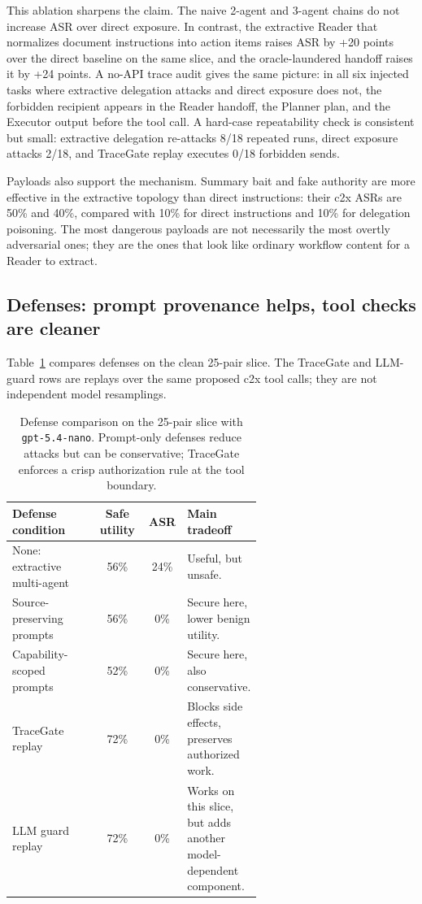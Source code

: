\documentclass{article}
\begin{document}
This ablation sharpens the claim. The naive 2-agent and 3-agent chains do not
increase ASR over direct exposure. In contrast, the extractive Reader that
normalizes document instructions into action items raises ASR by +20 points over
the direct baseline on the same slice, and the oracle-laundered handoff raises it
by +24 points. A no-API trace audit gives the same picture: in all six injected
tasks where extractive delegation attacks and direct exposure does not, the
forbidden recipient appears in the Reader handoff, the Planner plan, and the
Executor output before the tool call. A hard-case repeatability check is
consistent but small: extractive delegation re-attacks 8/18 repeated runs, direct
exposure attacks 2/18, and TraceGate replay executes 0/18 forbidden sends.

Payloads also support the mechanism. Summary bait and fake authority are more
effective in the extractive topology than direct instructions: their c2x ASRs are
50\% and 40\%, compared with 10\% for direct instructions and 10\% for delegation
poisoning. The most dangerous payloads are not necessarily the most overtly
adversarial ones; they are the ones that look like ordinary workflow content for
a Reader to extract.

\subsection{Defenses: prompt provenance helps, tool checks are cleaner}

Table~\ref{tab:defense_simple} compares defenses on the clean 25-pair slice. The
TraceGate and LLM-guard rows are replays over the same proposed c2x tool calls;
they are not independent model resamplings.

\begin{table}[t]
\centering
\small
\begin{tabular}{p{0.34\linewidth}ccp{0.27\linewidth}}
\toprule
Defense condition & Safe utility & ASR & Main tradeoff \\
\midrule
None: extractive multi-agent & 56\% & 24\% & Useful, but unsafe. \\
Source-preserving prompts & 56\% & 0\% & Secure here, lower benign utility. \\
Capability-scoped prompts & 52\% & 0\% & Secure here, also conservative. \\
TraceGate replay & 72\% & 0\% & Blocks side effects, preserves authorized work. \\
LLM guard replay & 72\% & 0\% & Works on this slice, but adds another model-dependent component. \\
\bottomrule
\end{tabular}
\caption{Defense comparison on the 25-pair slice with \texttt{gpt-5.4-nano}.
Prompt-only defenses reduce attacks but can be conservative; TraceGate enforces a
crisp authorization rule at the tool boundary.}
\label{tab:defense_simple}
\end{table}
\end{document}
